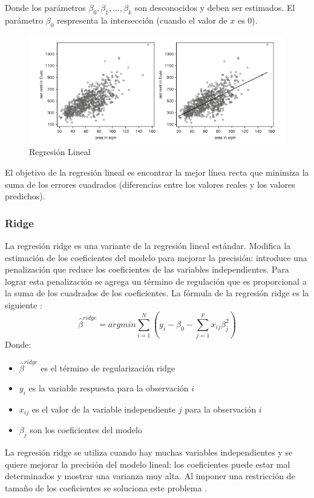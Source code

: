 \documentclass[12pt,a4paper,Spanish]{article}
\begin{document}
Donde los parámetros $\beta_0, \beta_1, ..., \beta_k$ son desconocidos y deben ser estimados. El parámetro $\beta_0$ respresenta la intersección (cuando el valor de $x$ es 0).
\newline
\begin{figure}[H]
	\centering
	\includegraphics[width=0.7\linewidth]{figs/linear_regression}
	\caption{Regresión Lineal}
	\label{fig:linearregression}
\end{figure}
El objetivo de la regresión lineal es encontrar la mejor línea recta que minimiza la suma de los errores cuadrados (diferencias entre los valores reales y los valores predichos).

\subsubsection{Ridge}
La regresión ridge es una variante de la regresión lineal estándar. Modifica la estimación de los coeficientes del modelo para mejorar la precisión: introduce una penalización que reduce los coeficientes de las variables independientes. Para lograr esta penalización se agrega un término de regulación que es proporcional a la suma de los cuadrados de los coeficientes. La fórmula de la regresión ridge es la siguiente \cite{hastie2009elements}:
\begin{equation}
	\hat{\beta}^{ridge} = argmin {\sum_{i=1}^{N}} (y_i - \beta_0 - \sum_{j=1}^{p}x_{ij}\beta^{2}_j)
\end{equation}
\newline
Donde:
\begin{itemize}
	\item $\hat{\beta}^{ridge}$ es el término de regularización ridge
	\item $y_i$ es la variable respuesta para la observación $i$
	\item $x_{ij}$ es el valor de la variable independiente $j$ para la observación $i$
	\item $\beta_{j}$ son los coeficientes del modelo
\end{itemize}

La regresión ridge se utiliza cuando hay muchas variables independientes y se quiere mejorar la precisión del modelo lineal: los coeficientes puede estar mal determinados y mostrar una varianza muy alta. Al imponer una restricción de tamaño de los coeficientes se soluciona este problema \cite{fahrmeir2013regression}.
\end{document}
